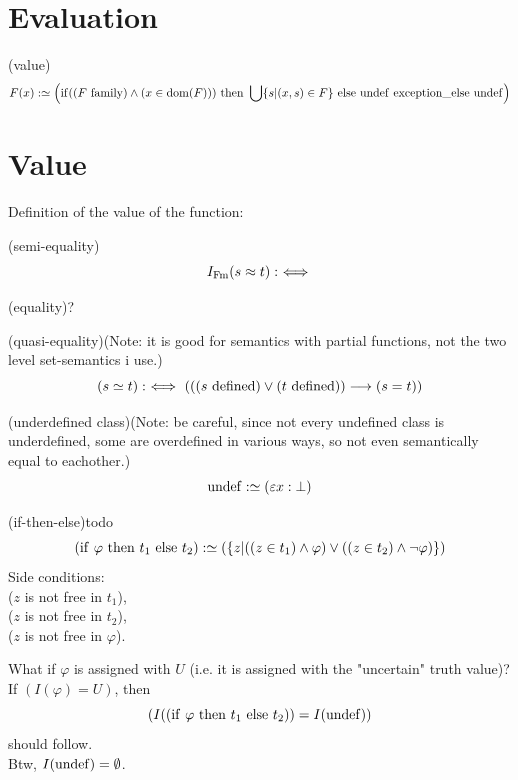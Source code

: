 \def\topic{Evaluation}

\section{Evaluation}
\begin{definition}(value)
\[
F(x) :\simeq \left(\lif ((F\family)\land(x \in \dom(F)))\ \lthen\ \union\{s|(x,s)\in F\}\ \lelse\ \lundef\ \lexception\_\lelse\ \lundef\right)
\]
\end{definition}

\section{Value} %
Definition of the value of the function:
\begin{definition}(semi-equality)
\[
I_{\mathrm{Fm}}(s\approx t) :\ \Longleftrightarrow\  
\]
\end{definition}

\begin{definition}(equality)?
\end{definition}

\begin{definition}(quasi-equality)(Note: it is good for semantics with partial functions, not the two level set-semantics i use.)
\[
(s\simeq t) :\ \Longleftrightarrow\  (((s \mathrm{\ defined})\lor(t \mathrm{\ defined})) \longrightarrow (s=t))
\]
\end{definition}

\begin{definition}(underdefined class)(Note: be careful, since not every undefined class is underdefined, some are overdefined in various ways, so not even semantically equal to eachother.)
\[
\mathrm{undef} :\simeq (\varepsilon x: \bot)
\]
\end{definition}

\begin{definition}(if-then-else)todo
\[
(\lif\ \varphi\ \lthen\ t_1\ \lelse\ t_2) :\simeq (\{z|((z\in t_1)\land\varphi)\lor((z\in t_2)\land\neg\varphi)\})
\]
Side conditions:\\
($z$ is not free in $t_1$),\\
($z$ is not free in $t_2$),\\
($z$ is not free in $\varphi$).\\
\end{definition}
What if $\varphi$ is assigned with $U$ (i.e. it is assigned with the "uncertain" truth value)?\\
If $(I(\varphi)=U)$, then 
\[
(I((\lif\ \varphi\ \lthen\ t_1\ \lelse\ t_2))=I(\lundef))
\]
should follow.\\
Btw, $I(\mathrm{undef})=\emptyset$.\\


